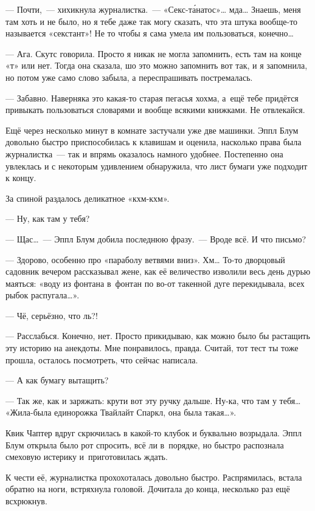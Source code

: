 \documentclass[fontsize=11pt,a5paper,titlepage=firstcover]{scrbook}
\begin{document}
--- Почти,~--- хихикнула журналистка.~--- «Секс-та́натос»{\ldots} мда{\ldots} Знаешь, меня там хоть и не было, но я тебе даже так могу сказать, что эта штука вообще-то называется «секстант»! Не то чтобы я сама умела им пользоваться, конечно{\ldots}

--- Ага. Скутс говорила. Просто я никак не могла запомнить, есть там на конце «т» или нет. Тогда она сказала, шо это можно запомнить вот так, и я запомнила, но потом уже само слово забыла, а переспрашивать постремалась.

--- Забавно. Наверняка это какая-то старая пегасья хохма, а~ещё тебе придётся привыкать пользоваться словарями и вообще всякими книжками. Не отвлекайся.

Ещё через несколько минут в комнате застучали уже две машинки. Эппл Блум довольно быстро приспособилась к клавишам и оценила, насколько права была журналистка~--- так и впрямь оказалось намного удобнее. Постепенно она увлеклась и с некоторым удивлением обнаружила, что лист бумаги уже подходит к концу.

За спиной раздалось деликатное «кхм-кхм».

--- Ну, как там у тебя?

--- Щас{\ldots}~--- Эппл Блум добила последнюю фразу.~--- Вроде всё. И что письмо?

--- Здорово, особенно про «параболу ветвями вниз». Хм{\ldots} То-то дворцовый садовник вечером рассказывал жене, как её величество изволили весь день дурью маяться: «воду из фонтана в~фонтан по во-от такенной дуге перекидывала, всех рыбок распугала{\ldots}».

--- Чё, серьёзно, что ль?!

--- Расслабься. Конечно, нет. Просто прикидываю, как можно было бы растащить эту историю на анекдоты. Мне понравилось, правда. Считай, тот тест ты тоже прошла, осталось посмотреть, что сейчас написала.

--- А как бумагу вытащить?

--- Так же, как и заряжать: крути вот эту ручку дальше. Ну-ка, что там у тебя{\ldots} «Жила-была единорожка Твайлайт Спаркл, она была такая{\ldots}».

Квик Чаптер вдруг скрючилась в какой-то клубок и буквально возрыдала. Эппл Блум открыла было рот спросить, всё ли в~порядке, но быстро распознала смеховую истерику и~приготовилась ждать.

К чести её, журналистка прохохоталась довольно быстро. Распрямилась, встала обратно на ноги, встряхнула головой. Дочитала до конца, несколько раз ещё всхрюкнув.
\end{document}
